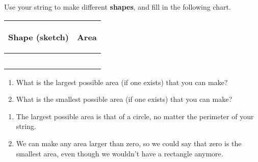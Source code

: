 \documentclass{ximera}
\begin{document}
\begin{problem}
\begin{instructorNotes}
\begin{enumerate}
\end{enumerate}
\end{instructorNotes}
\end{problem}
\newpage
\begin{problem} Use your string to make different {\bf shapes}, and fill in the following chart.
\vskip 0.1in
\begin{tabular}{|p{2.2in}|p{2.2in}|}
\hline
\begin{center} Shape (sketch) \end{center} & \begin{center} Area \end{center}  \\ \hline
 & \\ [10ex] \hline
 & \\ [10 ex] \hline
 & \\ [10 ex] \hline
 & \\ [10 ex] \hline
 & \\ [10 ex] \hline
\end{tabular}


\begin{enumerate}

\item What is the largest possible area (if one exists) that you can make?
\item What is the smallest possible area (if one exists) that you can make?
\end{enumerate}

\begin{solution}
\begin{enumerate}
\item The largest possible area is that of a circle, no matter the perimeter of your string.
\item We can make any area larger than zero, so we could say that zero is the smallest area, even though we wouldn't have a rectangle anymore.
\end{enumerate}
\end{solution}


\end{problem}
\end{document}
